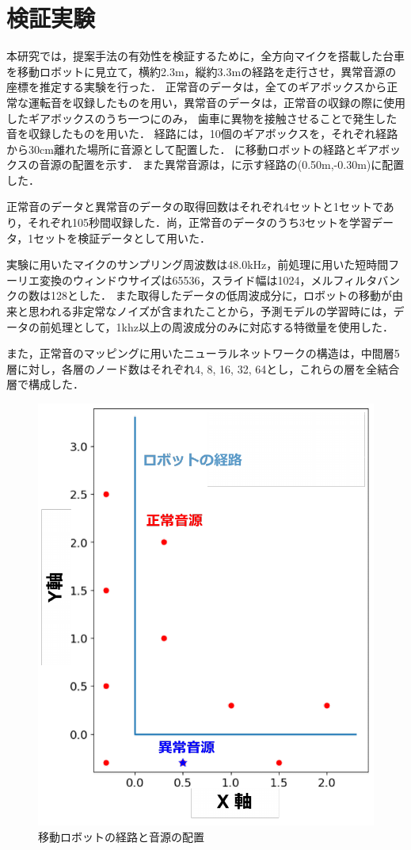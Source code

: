 \documentclass[../main]{subfiles}
\begin{document}
\graphicspath{{../figures/}}

\section{検証実験}
本研究では，提案手法の有効性を検証するために，全方向マイクを搭載した台車を移動ロボットに見立て，横約2.3m，縦約3.3mの経路を走行させ，異常音源の座標を推定する実験を行った．
正常音のデータは，全てのギアボックスから正常な運転音を収録したものを用い，異常音のデータは，正常音の収録の際に使用したギアボックスのうち一つにのみ，
歯車に異物を接触させることで発生した音を収録したものを用いた．
経路には，10個のギアボックスを，それぞれ経路から30cm離れた場所に音源として配置した．
に移動ロボットの経路とギアボックスの音源の配置を示す．
また異常音源は，に示す経路の(0.50m,-0.30m)に配置した．


正常音のデータと異常音のデータの取得回数はそれぞれ4セットと1セットであり，それぞれ105秒間収録した．尚，正常音のデータのうち3セットを学習データ，1セットを検証データとして用いた．


実験に用いたマイクのサンプリング周波数は48.0kHz，前処理に用いた短時間フーリエ変換のウィンドウサイズは65536，スライド幅は1024，メルフィルタバンクの数は128とした．
また取得したデータの低周波成分に，ロボットの移動が由来と思われる非定常なノイズが含まれたことから，予測モデルの学習時には，データの前処理として，1khz以上の周波成分のみに対応する特徴量を使用した．

また，正常音のマッピングに用いたニューラルネットワークの構造は，中間層5層に対し，各層のノード数はそれぞれ4, 8, 16, 32, 64とし，これらの層を全結合層で構成した．

\begin{figure}[tb]
  \centering
  \includegraphics[keepaspectratio, width=0.8\linewidth]{route.pdf}
  \caption{移動ロボットの経路と音源の配置}
\end{figure}
\end{document}
